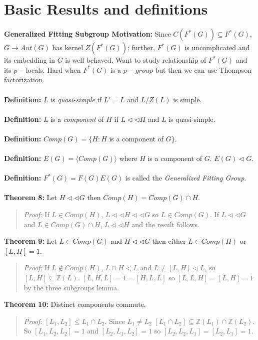 \section {Basic Results and definitions}
{\bf Generalized Fitting Subgroup Motivation:}
Since $C(F^*(G)) \subseteq F^*(G)$, $G \rightarrow Aut(G)$ has kernel $Z(F^* (G))$; further, $F^*(G)$ is uncomplicated and its embedding in $G$ is well behaved.  Want to study relationship
of $F^*(G)$ and its $p-$locals.  Hard when $F^*(G)$ is a $p-group$ but then we
can use Thompson factorization.  \\
\\
{\bf Definition:} $L$ is \emph{quasi-simple} if $L'=L$ and $L/Z(L)$ is simple.  \\
\\
{\bf Definition:} $L$ is a \emph{ component} of $H$ if
$L \lhd \lhd H$ and $L$ is quasi-simple.
\\
\\
{\bf Definition:} $Comp(G)= \{H: H$ is a component of $G \}$.
\\
\\
{\bf Definition:} $E(G)= \langle Comp(G) \rangle $ where $H$ is a component of $G$.  $E(G) \lhd G$.
\\
\\
{\bf Definition:} $F^*(G)=F(G)E(G)$ is called the \emph{Generalized Fitting Group}.
\\
\\
{\bf Theorem 8:} Let $H \lhd \lhd G$ then $Comp(H)= Comp(G) \cap H$.
\begin{quote}
\emph{Proof:}
If $L \in Comp(H)$, $L \lhd \lhd H \lhd \lhd G$ so $L \in Comp(G)$.  If
$L \lhd \lhd G$ and $L \in Comp(G) \cap H$, $L \lhd \lhd H$ and the result follows.
\end{quote}
{\bf Theorem 9:} Let $L \in Comp(G)$ and $H \lhd \lhd G$ then either $L \in Comp(H)$ or
$[L,H]= 1$.
\begin{quote}
\emph{Proof:}
If $L \notin Comp(H)$, $L \cap H < L$ and $L \ne [L, H] \lhd L$, so $[L,H] \subseteq {\mathbb Z}(L)$.  $[L,H,L]=1= [H,L,L]$ so $[L, L, H]= [L, H]=1$ by the three subgroups lemma.
\end{quote}
{\bf Theorem 10:} Distinct components commute.
\begin{quote}
\emph{Proof:}
$[L_1, L_2] \le L_1 \cap L_2$.  Since $L_1 \ne L_2$
$[L_1 \cap L_2] \subseteq {\mathbb Z}(L_1) \cap {\mathbb Z}(L_2)$.
So
$[L_1, L_2, L_2] =1$ and
$[L_2, L_1, L_2] =1$ so $[L_2, L_2, L_1]= [L_2, L_1]=1$.
\end{quote}
